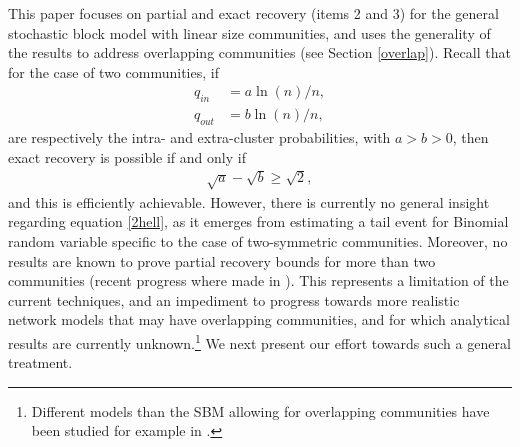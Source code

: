 \documentclass[11pt]{article}
\DeclareMathOperator{\diag}{diag}
\newcommand{\1}{\mathbb{1}}
\begin{document}
This paper focuses on partial and exact recovery (items 2 and 3) for the general stochastic block model with linear size communities, and uses the generality of the results to address overlapping communities (see Section \ref{overlap}).
Recall that for the case of two communities, if 
\begin{align*}
q_{in}&=a \ln(n)/n,\\
q_{out}&=b \ln(n)/n,
\end{align*}
are respectively the intra- and extra-cluster probabilities, with $a>b>0$, then exact recovery is possible if and only if
\begin{align}
\sqrt{a} - \sqrt{b} \geq \sqrt{2}, \label{2hell}
\end{align}
and this is efficiently achievable. However, there is currently no general insight regarding equation \eqref{2hell}, as it emerges from estimating a tail event for Binomial random variable specific to the case of two-symmetric communities. Moreover, no results are known to prove partial recovery bounds for more than two communities (recent progress where made in \cite{new-vu}). This represents a limitation of the current techniques, and an impediment to progress towards more realistic network models that may have overlapping communities, and for which analytical results are currently unknown.\footnote{Different models than the SBM allowing for overlapping communities have been studied for example in \cite{arora-overlap}.} We next present our effort towards such a general treatment.
 




\end{document}
